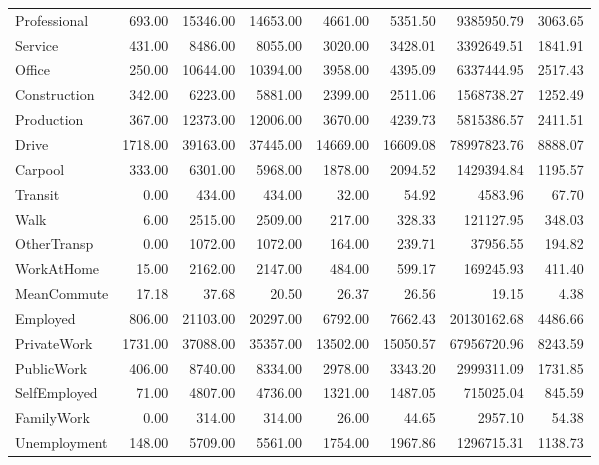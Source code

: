 \documentclass{article}
\begin{document}
\begin{table}
\begin{tabular}{l|rrrrrrr}
		Professional & 693.00 & 15346.00 & 14653.00 & 4661.00 & 5351.50 & 9385950.79 & 3063.65\\
		Service & 431.00 & 8486.00 & 8055.00 & 3020.00 & 3428.01 & 3392649.51 & 1841.91\\
		Office & 250.00 & 10644.00 & 10394.00 & 3958.00 & 4395.09 & 6337444.95 & 2517.43\\
		Construction & 342.00 & 6223.00 & 5881.00 & 2399.00 & 2511.06 & 1568738.27 & 1252.49\\
		Production & 367.00 & 12373.00 & 12006.00 & 3670.00 & 4239.73 & 5815386.57 & 2411.51\\
		Drive & 1718.00 & 39163.00 & 37445.00 & 14669.00 & 16609.08 & 78997823.76 & 8888.07\\
		Carpool & 333.00 & 6301.00 & 5968.00 & 1878.00 & 2094.52 & 1429394.84 & 1195.57\\
		Transit & 0.00 & 434.00 & 434.00 & 32.00 & 54.92 & 4583.96 & 67.70\\
		Walk & 6.00 & 2515.00 & 2509.00 & 217.00 & 328.33 & 121127.95 & 348.03\\
		OtherTransp & 0.00 & 1072.00 & 1072.00 & 164.00 & 239.71 & 37956.55 & 194.82\\
		WorkAtHome & 15.00 & 2162.00 & 2147.00 & 484.00 & 599.17 & 169245.93 & 411.40\\
		MeanCommute & 17.18 & 37.68 & 20.50 & 26.37 & 26.56 & 19.15 & 4.38\\
		Employed & 806.00 & 21103.00 & 20297.00 & 6792.00 & 7662.43 & 20130162.68 & 4486.66\\
		PrivateWork & 1731.00 & 37088.00 & 35357.00 & 13502.00 & 15050.57 & 67956720.96 & 8243.59\\
		PublicWork & 406.00 & 8740.00 & 8334.00 & 2978.00 & 3343.20 & 2999311.09 & 1731.85\\
		SelfEmployed & 71.00 & 4807.00 & 4736.00 & 1321.00 & 1487.05 & 715025.04 & 845.59\\
		FamilyWork & 0.00 & 314.00 & 314.00 & 26.00 & 44.65 & 2957.10 & 54.38\\
		Unemployment & 148.00 & 5709.00 & 5561.00 & 1754.00 & 1967.86 & 1296715.31 & 1138.73\\
	\end{tabular}
\end{table}
\end{document}
